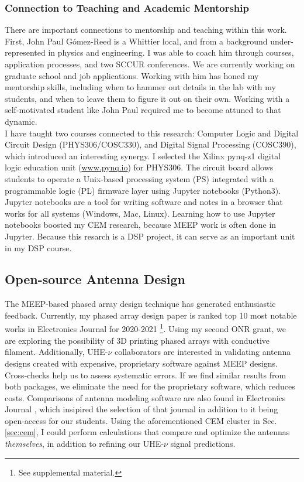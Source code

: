 \documentclass[../../../main.tex]{subfiles}
\begin{document}
\subsubsection{Connection to Teaching and Academic Mentorship}

There are important connections to mentorship and teaching within this work.  First, John Paul G\'{o}mez-Reed is a Whittier local, and from a background under-represented in physics and engineering.  I was able to coach him through courses, application processes, and two SCCUR conferences.  We are currently working on graduate school and job applications.  Working with him has honed my mentorship skills, including when to hammer out details in the lab with my students, and when to leave them to figure it out on their own.  Working with a self-motivated student like John Paul required me to become attuned to that dynamic.
\\
\vspace{0.25cm}
I have taught two courses connected to this research: Computer Logic and Digital Circuit Design (PHYS306/COSC330), and Digital Signal Processing (COSC390), which introduced an interesting synergy.  I selected the Xilinx pynq-z1 digital logic education unit (\url{www.pynq.io}) for PHYS306.  The circuit board allows students to operate a Unix-based processing system (PS) integrated with a programmable logic (PL) firmware layer using Jupyter notebooks (Python3).  Jupyter notebooks are a tool for writing software and notes in a browser that works for all systems (Windows, Mac, Linux).  Learning how to use Jupyter notebooks boosted my CEM research, because MEEP work is often done in Jupyter.  Because this resarch is a DSP project, it can serve as an important unit in my DSP course.

\subsection{Open-source Antenna Design}

The MEEP-based phased array design technique has generated enthusiastic feedback.  Currently, my phased array design paper is ranked top 10 most notable works in Electronics Journal for 2020-2021 \cite{electronics10040415}\footnote{See supplemental material.}.  Using my second ONR grant, we are exploring the possibility of 3D printing phased arrays with conductive filament.  Additionally, UHE-$\nu$ collaborators are interested in validating antenna designs created with expensive, proprietary software against MEEP designs.  Cross-checks help us to assess systematic errors.  If we find similar results from both packages, we eliminate the need for the proprietary software, which reduces costs.  Comparisons of antenna modeling software are also found in Electronics Journal \cite{10.3390/electronics8121506}, which insipired the selection of that journal in addition to it being open-access for our students.  Using the aforementioned CEM cluster in Sec. \ref{sec:cem}, I could perform calculations that compare and optimize the antennas \textit{themselves}, in addition to refining our UHE-$\nu$ signal predictions.
\end{document}
